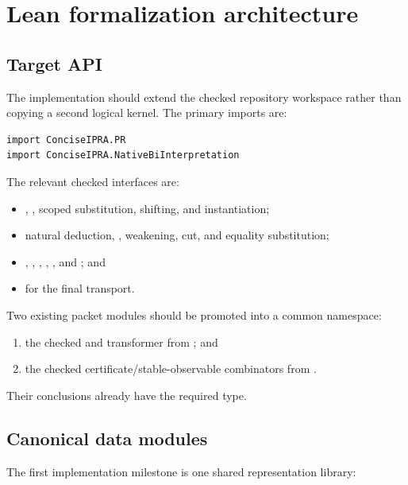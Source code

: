 \section{Lean formalization architecture}
\label{sec:lean}

\subsection{Target API}

The implementation should extend the checked repository workspace rather than
copying a second logical kernel.  The primary imports are:

\begin{lstlisting}
import ConciseIPRA.PR
import ConciseIPRA.NativeBiInterpretation
\end{lstlisting}

The relevant checked interfaces are:
\begin{itemize}
\item {}, , scoped substitution, shifting, and instantiation;
\item {} natural deduction, , weakening, cut, and
      equality substitution;
\item {}, , , ,
      , and ; and
\item {} for the final transport.
\end{itemize}

Two existing packet modules should be promoted into a common
 namespace:
\begin{enumerate}[label=(\roman*)]
\item the checked  and
       transformer from
      ; and
\item the checked certificate/stable-observable combinators from
      .
\end{enumerate}
Their conclusions already have the required  type.

\subsection{Canonical data modules}

The first implementation milestone is one shared representation library:

